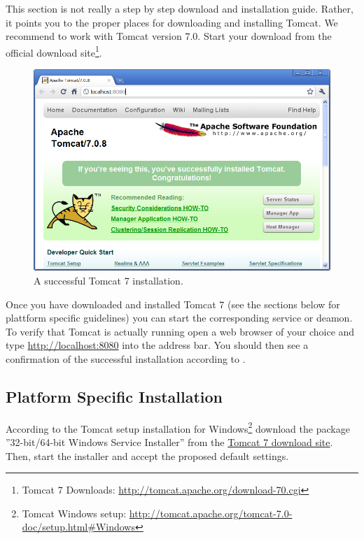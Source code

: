 \documentclass[a4paper,10pt,twoside]{book}
\begin{document}
This section is not really a step by step download and installation guide. 
Rather, it points you to the proper places for downloading and installing Tomcat.
We recommend to work with Tomcat version 7.0.
Start your download from the official download site\footnote{
Tomcat 7 Downloads: \url{http://tomcat.apache.org/download-70.cgi}
}.

\begin{figure}
\includegraphics[width=14cm]{tomcat_install.png}
\caption{A successful Tomcat 7 installation.}
\end{figure}

Once you have downloaded and installed Tomcat 7 (see the sections below for plattform specific guidelines) you can start the corresponding service or deamon.
To verify that Tomcat is actually running open a web browser of your choice and type \url{http://localhost:8080} into the address bar.
You should then see a confirmation of the successful installation according to .

\subsection{Platform Specific Installation}

According to the Tomcat setup installation for Windows\footnote{
Tomcat Windows setup: \url{http://tomcat.apache.org/tomcat-7.0-doc/setup.html#Windows}
}
download the package ''32-bit/64-bit Windows Service Installer'' from the \href{http://tomcat.apache.org/download-70.cgi}{Tomcat 7 download site}.
Then, start the installer and accept the proposed default settings.
\end{document}
